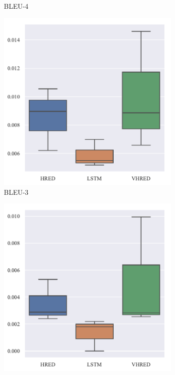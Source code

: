 \begin{figure}[H]
\begin{subfigure}{0.24\linewidth}
        \caption{BLEU-4}
    \end{subfigure}%
    \begin{subfigure}{0.24\linewidth}
        \centering
        \includegraphics[width=\linewidth]{figure/boxplot/model/bleu_3/plot.pdf}
        \caption{BLEU-3}
    \end{subfigure}%
    \begin{subfigure}{0.24\linewidth}
        \centering
        \includegraphics[width=\linewidth]{figure/boxplot/model/bleu_4/plot.pdf}

\end{subfigure}
\end{figure}

